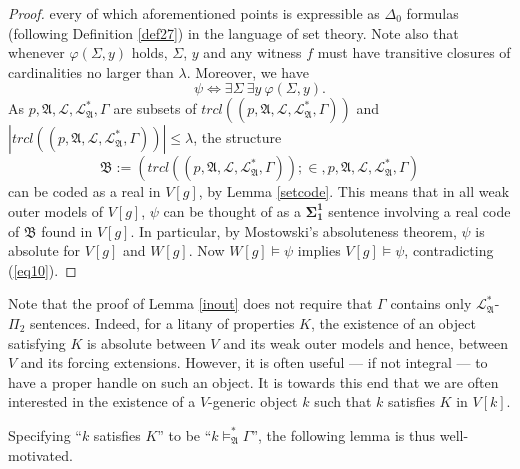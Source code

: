\documentclass[12pt, twoside]{memoir}
\numberwithin{equation}{section}
\theoremstyle{definition}
\theoremstyle{remark}
\theoremstyle{definition}
\theoremstyle{definition}
\theoremstyle{definition}
\theoremstyle{remark}
\begin{document}
\begin{proof}
every of which aforementioned points is expressible as $\Delta_0$ formulas (following Definition \ref{def27}) in the language of set theory. Note also that whenever $\varphi(\Sigma, y)$ holds, $\Sigma$, $y$ and any witness $f$ must have transitive closures of cardinalities no larger than $\lambda$. Moreover, we have $$\psi \iff \exists \Sigma \ \exists y \ \varphi(\Sigma, y).$$ As $p, \mathfrak{A}, \mathcal{L}, \mathcal{L}^*_{\mathfrak{A}}, \Gamma$ are subsets of $trcl((p, \mathfrak{A}, \mathcal{L}, \mathcal{L}^*_{\mathfrak{A}}, \Gamma))$ and $|trcl((p, \mathfrak{A}, \mathcal{L}, \mathcal{L}^*_{\mathfrak{A}}, \Gamma))| \leq \lambda$, the structure $$\mathfrak{B} := (trcl((p, \mathfrak{A}, \mathcal{L}, \mathcal{L}^*_{\mathfrak{A}}, \Gamma)); \in, p, \mathfrak{A}, \mathcal{L}, \mathcal{L}^*_{\mathfrak{A}}, \Gamma)$$ can be coded as a real in $V[g]$, by Lemma \ref{setcode}. This means that in all weak outer models of $V[g]$, $\psi$ can be thought of as a $\mathbf{\Sigma^1_1}$ sentence involving a real code of $\mathfrak{B}$ found in $V[g]$. In particular, by Mostowski's absoluteness theorem, $\psi$ is absolute for $V[g]$ and $W[g]$. Now $W[g] \models \psi$ implies $V[g] \models \psi$, contradicting (\ref{eq10}).
\end{proof}

Note that the proof of Lemma \ref{inout} does not require that $\Gamma$ contains only $\mathcal{L}^*_{\mathfrak{A}}$-$\Pi_2$ sentences. Indeed, for a litany of properties $K$, the existence of an object satisfying $K$ is absolute between $V$ and its weak outer models and hence, between $V$ and its forcing extensions. However, it is often useful --- if not integral --- to have a proper handle on such an object. It is towards this end that we are often interested in the existence of a $V$-generic object $k$ such that $k$ satisfies $K$ in $V[k]$.

Specifying ``$k$ satisfies $K$'' to be ``$k \models^{*}_{\mathfrak{A}} \Gamma$'', the following lemma is thus well-motivated. 
\end{document}
